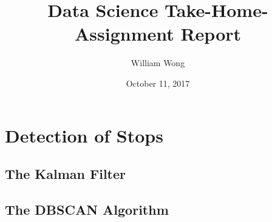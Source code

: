 \documentclass[12pt]{article}
\begin{document}
\title{Data Science Take-Home-Assignment Report}

\author{William Wong}
\date{October 11, 2017}

\maketitle


\section{Detection of Stops}

\subsection{The Kalman Filter}


\subsection{The DBSCAN Algorithm}
\end{document}
